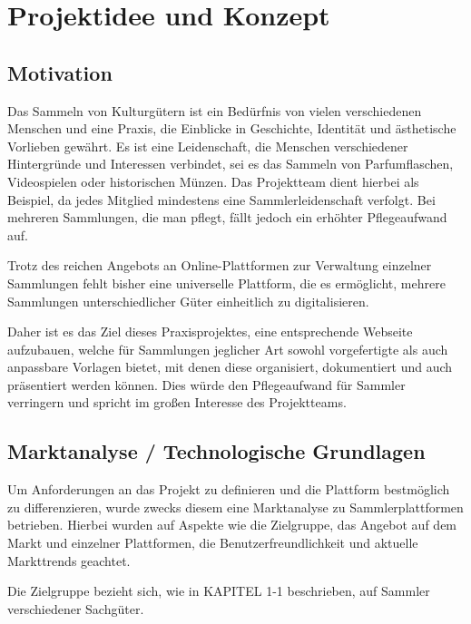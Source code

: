 \section{Projektidee und Konzept}\label{sec:projektidee-und-konzept}

\subsection{Motivation}\label{subsec:motivation}


Das Sammeln von Kulturgütern ist ein Bedürfnis von vielen verschiedenen Menschen und eine Praxis, die Einblicke in Geschichte, Identität und ästhetische Vorlieben gewährt.
Es ist eine Leidenschaft, die Menschen verschiedener Hintergründe und Interessen verbindet, sei es das Sammeln von Parfumflaschen, Videospielen oder historischen Münzen.
Das Projektteam dient hierbei als Beispiel, da jedes Mitglied mindestens eine Sammlerleidenschaft verfolgt.
Bei mehreren Sammlungen, die man pflegt, fällt jedoch ein erhöhter Pflegeaufwand auf. \par
Trotz des reichen Angebots an Online-Plattformen zur Verwaltung einzelner Sammlungen fehlt bisher eine universelle Plattform, die es ermöglicht, mehrere Sammlungen unterschiedlicher Güter einheitlich zu digitalisieren. \par
Daher ist es das Ziel dieses Praxisprojektes, eine entsprechende Webseite aufzubauen, welche für Sammlungen jeglicher Art sowohl vorgefertigte als auch anpassbare Vorlagen bietet, mit denen diese organisiert, dokumentiert und auch präsentiert werden können.
Dies würde den Pflegeaufwand für Sammler verringern und spricht im großen Interesse des Projektteams.


\subsection{Marktanalyse / Technologische Grundlagen}\label{subsec:marktanalyse-technologische-grundlagen}

Um Anforderungen an das Projekt zu definieren und die Plattform bestmöglich zu differenzieren, wurde zwecks diesem eine Marktanalyse zu Sammlerplattformen betrieben.
Hierbei wurden auf Aspekte wie die Zielgruppe, das Angebot auf dem Markt und einzelner Plattformen, die Benutzerfreundlichkeit und aktuelle Markttrends geachtet. \par
Die Zielgruppe bezieht sich, wie in KAPITEL 1-1 beschrieben, auf Sammler verschiedener Sachgüter. \linebreak



